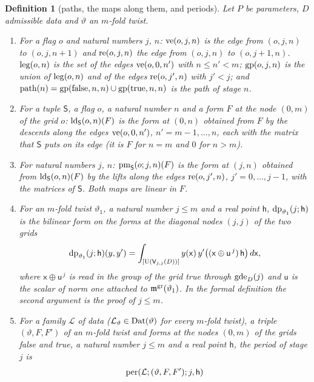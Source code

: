 \documentclass[11pt,a4paper]{article}
\newcommand{\kw}[1]{\emph{#1}}
\theoremstyle{plainx}
\theoremstyle{uprightx}
\newtheorem{definition}[theorem]{Definition}
\newcommand{\sS}{\mathsf{S}}
\newcommand{\sV}{\mathsf{V}}
\newcommand{\sh}{\mathsf{h}}
\newcommand{\sx}{\mathsf{x}}
\newcommand{\su}{\mathsf{u}}
\newcommand{\U}{\operatorname{U}}
\newcommand{\cL}{\mathcal{L}}
\begin{document}
\begin{definition}[paths, the maps along them, and periods]\label{d:paths}
Let $P$ be parameters, $D$ admissible data and $\vartheta$ an $m$-fold twist.
\begin{enumerate}[label=\textup{(\alph*)},leftmargin=2.3em,itemsep=1pt]
\item For a flag $o$ and natural numbers $j$, $n$: $\operatorname{ve}(o,j,n)$ is the edge from $(o,j,n)$ to
$(o,j,n+1)$ and $\operatorname{re}(o,j,n)$ the edge from $(o,j,n)$ to $(o,j+1,n)$. $\operatorname{leg}(o,n)$ is the set of the
edges $\operatorname{ve}(o,0,n')$ with $n\le n'<m$; $\operatorname{gp}(o,j,n)$ is the union of $\operatorname{leg}(o,n)$ and of the
edges $\operatorname{re}(o,j',n)$ with $j'<j$; and
$\operatorname{path}(n)=\operatorname{gp}(\mathrm{false},n,n)\cup\operatorname{gp}(\mathrm{true},n,n)$ is the \kw{path of stage $n$}.
\item For a tuple $\sS$, a flag $o$, a natural number $n$ and a form $F$ at the node $(0,m)$ of the grid $o$:
$\legDescents{\sS}{o}{n}{F}$ is the form at $(0,n)$ obtained from $F$ by the descents along the edges
$\operatorname{ve}(o,0,n')$, $n'=m-1,\dots,n$, each with the matrix that $\sS$ puts on its edge (it is $F$ for $n=m$
and $0$ for $n>m$).
\item For natural numbers $j$, $n$: $\gridPathMap{\sS}{o}{j}{n}{F}$ is the form at $(j,n)$ obtained from
$\legDescents{\sS}{o}{n}{F}$ by the lifts along the edges $\operatorname{re}(o,j',n)$, $j'=0,\dots,j-1$, with the matrices
of $\sS$. Both maps are linear in $F$.
\item For an $m$-fold twist $\vartheta_1$, a natural number $j\le m$ and a real point $\sh$,
$\diagonalPeriodForm{\vartheta_1}{j}{\sh}$ is the bilinear form on the forms at the diagonal nodes $(j,j)$ of the
two grids
\[\diagonalPeriodForm{\vartheta_1}{j}{\sh}(y,y')=\int_{[\U(\sV_{j,j}(D))]}y(\sx)\,y'\bigl((\sx\oplus\su^{\,j})\,\sh\bigr)\,d\sx,\]
where $\sx\oplus\su^{\,j}$ is read in the group of the grid true through $\operatorname{gde}_{D}(j)$ and $\su$ is the
scalar of norm one attached to $\mathfrak{m}^{\mathrm{gr}}(\vartheta_1)$. In the formal definition the second argument is the
proof of $j\le m$.
\item For a family $\cL$ of data ($\cL_\vartheta\in\GridDatum{\vartheta}$ for every $m$-fold twist), a triple
$(\vartheta,F,F')$ of an $m$-fold twist and forms at the nodes $(0,m)$ of the grids false and true, a natural
number $j\le m$ and a real point $\sh$, the \kw{period of stage $j$} is
\begin{multline*}
\gridPeriod{\cL}{(\vartheta,F,F')}{j}{\sh}\\

\end{multline*}
\end{enumerate}
\end{definition}
\end{document}
